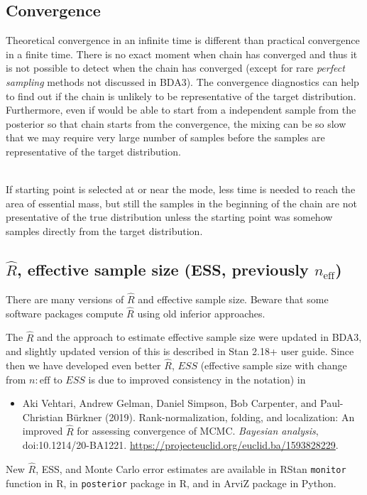 \documentclass[a4paper,11pt,english]{article}
\def\eff{\mathrm{eff}}
\begin{document}
\subsection*{Convergence}

Theoretical convergence in an infinite time is different than
practical convergence in a finite time. There is no exact moment when
chain has converged and thus it is not possible to detect when the
chain has converged (except for rare \emph{perfect sampling} methods
not discussed in BDA3). The convergence diagnostics can help to find
out if the chain is unlikely to be representative of the target
distribution. Furthermore, even if would be able to start from a
independent sample from the posterior so that chain starts from the
convergence, the mixing can be so slow that we may require very large
number of samples before the samples are representative of the target
distribution.

~\\
If starting point is selected at or near the mode, less time is needed
to reach the area of essential mass, but still the samples in the
beginning of the chain are not presentative of the true distribution
unless the starting point was somehow samples directly from the target
distribution. 

\subsection*{$\widehat{R}$, effective sample size (ESS, previously $n_\eff$)}

There are many versions of $\widehat{R}$ and effective sample size. Beware
that some software packages compute $\widehat{R}$ using old inferior
approaches.

The $\hat{R}$ and the approach to estimate effective sample size were
updated in BDA3, and slightly updated version of this is described in
Stan 2.18+ user guide. Since then we have developed even better
$\hat{R}$, $ESS$ (effective sample size with change from
$n:\eff$ to $ESS$ is due to improved consistency in the notation) in
 \begin{itemize}
 \item Aki Vehtari, Andrew Gelman, Daniel Simpson, Bob Carpenter, and
   Paul-Christian Bürkner (2019). Rank-normalization, folding, and
   localization: An improved $\widehat{R}$ for assessing convergence of
   MCMC.  {\em Bayesian analysis}, doi:10.1214/20-BA1221. \url{https://projecteuclid.org/euclid.ba/1593828229}.
 \end{itemize}
 New $\hat{R}$, ESS, and Monte Carlo error estimates are available in
 RStan {\tt monitor} function in R, in {\tt posterior} package in R,
 and in ArviZ package in Python.
 
\end{document}
